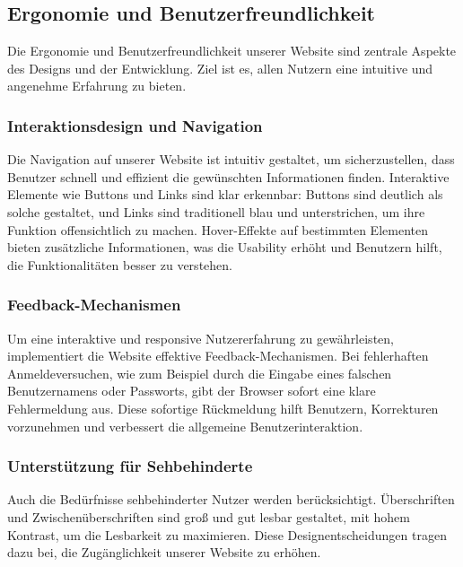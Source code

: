 

\subsection{Ergonomie und Benutzerfreundlichkeit}

Die Ergonomie und Benutzerfreundlichkeit unserer Website sind zentrale Aspekte des Designs und der Entwicklung. Ziel ist es, allen Nutzern eine intuitive und angenehme Erfahrung zu bieten.

\subsubsection{Interaktionsdesign und Navigation}
Die Navigation auf unserer Website ist intuitiv gestaltet, um sicherzustellen, dass Benutzer schnell und effizient die gewünschten Informationen finden. Interaktive Elemente wie Buttons und Links sind klar erkennbar: Buttons sind deutlich als solche gestaltet, und Links sind traditionell blau und unterstrichen, um ihre Funktion offensichtlich zu machen. Hover-Effekte auf bestimmten Elementen bieten zusätzliche Informationen, was die Usability erhöht und Benutzern hilft, die Funktionalitäten besser zu verstehen.

\subsubsection{Feedback-Mechanismen}
Um eine interaktive und responsive Nutzererfahrung zu gewährleisten, implementiert die Website effektive Feedback-Mechanismen. Bei fehlerhaften Anmeldeversuchen, wie zum Beispiel durch die Eingabe eines falschen Benutzernamens oder Passworts, gibt der Browser sofort eine klare Fehlermeldung aus. Diese sofortige Rückmeldung hilft Benutzern, Korrekturen vorzunehmen und verbessert die allgemeine Benutzerinteraktion.

\newpage

\subsubsection{Unterstützung für Sehbehinderte}
Auch die Bedürfnisse sehbehinderter Nutzer werden berücksichtigt. Überschriften und Zwischenüberschriften sind groß und gut lesbar gestaltet, mit hohem Kontrast, um die Lesbarkeit zu maximieren. Diese Designentscheidungen tragen dazu bei, die Zugänglichkeit unserer Website zu erhöhen.


